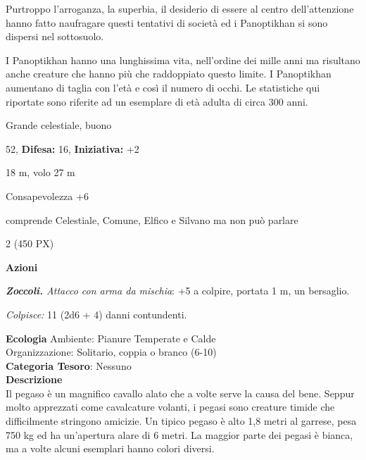 \begin{multicols}{2}
{Purtroppo l'arroganza, la superbia, il desiderio di essere al centro dell'attenzione hanno fatto naufragare questi tentativi di società ed i Panoptikhan si sono dispersi nel sottosuolo.

I Panoptikhan hanno una lunghissima vita, nell'ordine dei mille anni ma risultano anche creature che hanno più che raddoppiato questo limite. I Panoptikhan aumentano di taglia con l'età e così il numero di occhi. Le statistiche qui riportate sono riferite ad un esemplare di età adulta di circa 300 anni.

\noindent
\begin{description}[noitemsep, topsep=0pt, parsep=0pt, partopsep=0pt, leftmargin=0cm, labelwidth=2.2cm]
	\item[\textbf{Taglia/Tipo:}] Grande celestiale, buono
	\item[\textbf{Caratt.:}] 
	\item[\textbf{Punti Ferita:}] 52,  \textbf{Difesa:} 16,  \textbf{Iniziativa:} +2
	\item[\textbf{Movimento:}] 18 m, volo 27 m
	\item[\textbf{Tiri Salvez.:}] 
	\item[\textbf{Comp.:}] Consapevolezza +6
	\item[\textbf{Linguaggi:}] comprende Celestiale, Comune, Elfico e Silvano ma non può parlare
	\item[\textbf{Sfida:}] 2 (450 PX)\smallskip
\end{description}

\textbf{Azioni}

\emph{\textbf{Zoccoli.} Attacco con arma da mischia}: +5 a colpire, portata 1 m, un bersaglio.

\emph{Colpisce:} 11 (2d6 + 4) danni contundenti.

\textbf{Ecologia}
Ambiente: Pianure Temperate e Calde\\
Organizzazione: Solitario, coppia o branco (6-10)\\
\textbf{Categoria Tesoro}: Nessuno\\
\textbf{Descrizione}\\
Il pegaso è un magnifico cavallo alato che a volte serve la causa del bene. Seppur molto apprezzati come cavalcature volanti, i pegasi sono creature timide che difficilmente stringono amicizie. Un tipico pegaso è alto 1,8 metri al garrese, pesa 750 kg ed ha un'apertura alare di 6 metri. La maggior parte dei pegasi è bianca, ma a volte alcuni esemplari hanno colori diversi.

}
\end{multicols}
